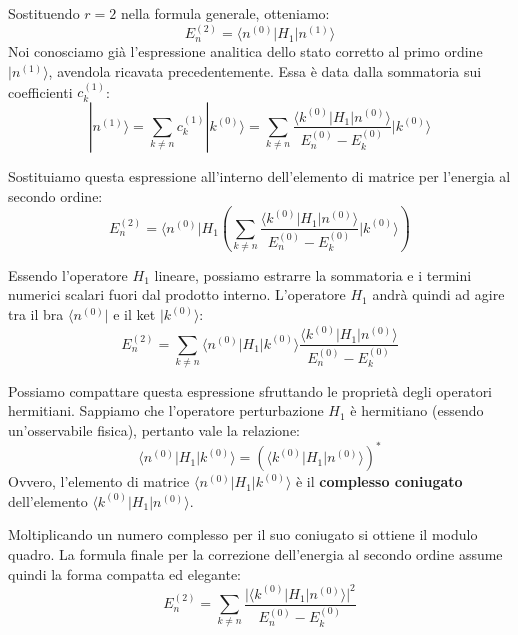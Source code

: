 Sostituendo $r=2$ nella formula generale, otteniamo:
\begin{equation}
E_n^{(2)} = \langle n^{(0)} | H_1 | n^{(1)} \rangle
\end{equation}
Noi conosciamo già l'espressione analitica dello stato corretto al primo ordine $\vert{}n^{(1)}\rangle$, avendola ricavata precedentemente. Essa è data dalla sommatoria sui coefficienti $c_k^{(1)}$:
\begin{equation}
|n^{(1)}\rangle = \sum_{k \neq n} c_k^{(1)} |k^{(0)}\rangle = \sum_{k \neq n} \frac{\langle k^{(0)} | H_1 | n^{(0)} \rangle}{E_n^{(0)} - E_k^{(0)}} |k^{(0)}\rangle
\end{equation}

Sostituiamo questa espressione all'interno dell'elemento di matrice per l'energia al secondo ordine:
\begin{equation}
E_n^{(2)} = \langle n^{(0)} | H_1 \left( \sum_{k \neq n} \frac{\langle k^{(0)} | H_1 | n^{(0)} \rangle}{E_n^{(0)} - E_k^{(0)}} |k^{(0)}\rangle \right)
\end{equation}

Essendo l'operatore $H_1$ lineare, possiamo estrarre la sommatoria e i termini numerici scalari fuori dal prodotto interno. L'operatore $H_1$ andrà quindi ad agire tra il bra $\langle n^{(0)} \vert{}$ e il ket $\vert{}k^{(0)}\rangle$:
\begin{equation}
E_n^{(2)} = \sum_{k \neq n} \langle n^{(0)} | H_1 | k^{(0)} \rangle \frac{\langle k^{(0)} | H_1 | n^{(0)} \rangle}{E_n^{(0)} - E_k^{(0)}}
\end{equation}

Possiamo compattare questa espressione sfruttando le proprietà degli operatori hermitiani. Sappiamo che l'operatore perturbazione $H_1$ è hermitiano (essendo un'osservabile fisica), pertanto vale la relazione:
\begin{equation}
\langle n^{(0)} | H_1 | k^{(0)} \rangle = \left( \langle k^{(0)} | H_1 | n^{(0)} \rangle \right)^*
\end{equation}
Ovvero, l'elemento di matrice $\langle n^{(0)} \vert{} H_1 \vert{} k^{(0)} \rangle$ è il \textbf{complesso coniugato} dell'elemento $\langle k^{(0)} \vert{} H_1 \vert{} n^{(0)} \rangle$.

Moltiplicando un numero complesso per il suo coniugato si ottiene il modulo quadro. La formula finale per la correzione dell'energia al secondo ordine assume quindi la forma compatta ed elegante:
\begin{equation}
E_n^{(2)} = \sum_{k \neq n} \frac{\big| \langle k^{(0)} | H_1 | n^{(0)} \rangle \big|^2}{E_n^{(0)} - E_k^{(0)}}
\end{equation}

